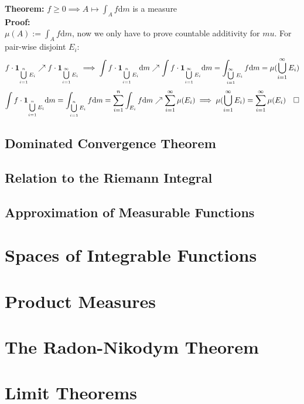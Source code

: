 \documentclass{article}
\newcommand{\sumiinf}{\sum\limits_{i=1}^\infty}
\newcommand{\cupiinf}{\bigcup\limits_{i=1}^\infty}
\newcommand{\sumin}{\sum\limits_{i=1}^n}
\newcommand{\cupin}{\bigcup\limits_{i=1}^n}
\newcommand{\0}{{\bf{0}}}
\newcommand{\1}{{\bf{1}}}
\newcommand{\dint}{\displaystyle\int}
\newcommand{\dif}{\mbox{d}}
\newcommand{\incto}{\nearrow}
\begin{document}
\textbf{Theorem:} $f\geq0\implies A\mapsto\dint_Af\dif m$ is a measure\\
\textbf{Proof:}\\
$\mu(A):=\dint_Af\dif m$, now we only have to prove countable additivity for $mu$. For pair-wise disjoint $E_i:$
$$f\cdot\1_{\cupin E_i}\incto f\cdot \1_{\cupiinf E_i}\implies\int f\cdot\1_{\cupin E_i}\dif m\incto\int f\cdot\1_{\cupiinf E_i}\dif m=\dint_{\cupiinf E_i}f\dif m=\mu(\cupiinf E_i)$$
$$\int f\cdot\1_{\cupin E_i}\dif m=\int_{\cupin E_i}f\dif m=\sumin\int_{E_i}f\dif m\incto\sumiinf\mu(E_i)\implies\mu(\cupiinf E_i)=\sumiinf\mu(E_i)\quad\square$$
\subsection{Dominated Convergence Theorem}
\subsection{Relation to the Riemann Integral}
\subsection{Approximation of Measurable Functions}
\clearpage
\section{Spaces of Integrable Functions}
\clearpage
\section{Product Measures}
\clearpage
\section{The Radon-Nikodym Theorem}
\clearpage
\section{Limit Theorems}
\clearpage
\end{document}
